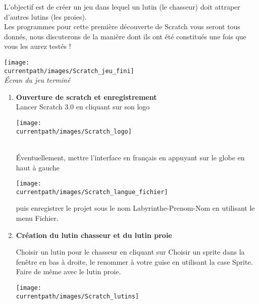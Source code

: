 \begin{changemargin}{-15mm}{-15mm}
\begin{enigme}
    L'objectif est de créer un jeu dans lequel un lutin (le chasseur) doit attraper d'autres lutins (les proies). \\
    Les programmes pour cette première découverte de Scratch vous seront tous donnés, nous discuterons de la manière dont ils ont été constitués une fois que vous les aurez testés !
    \begin{center}
       \texttt{[image: \\currentpath/images/Scratch\_jeu\_fini]} \\
       {\it Écran du jeu terminé}
    \end{center}

    \begin{enumerate}
       \item {\bf Ouverture de scratch et enregistrement} \dotfill \\ [1mm]
          Lancer \textcolor{B1}{Scratch 3.0} en cliquant sur son logo \parbox{1cm}{\texttt{[image: \\currentpath/images/Scratch\_logo]}} \\
          Éventuellement, mettre l'interface en français en appuyant sur le \textcolor{B1}{globe} en haut à gauche \parbox{2.5cm}{\texttt{[image: \\currentpath/images/Scratch\_langue\_fichier]}} puis enregistrer le projet sous le nom \og Labyrinthe-Prenom-Nom \fg{} en utilisant le menu \textcolor{B1}{Fichier}. \\
 
       \item {\bf Création du lutin chasseur et du lutin proie} \dotfill \\ 
          \begin{minipage}{8cm}
             Choisir un lutin pour le chasseur en cliquant sur \textcolor{B1}{Choisir un sprite} dans la fenêtre en bas à droite, le renommer à votre guise en utilisant la case \textcolor{B1}{Sprite}. \\
             Faire de même avec le lutin proie.
          \end{minipage}
          \qquad
          \begin{minipage}{7cm}
             \texttt{[image: \\currentpath/images/Scratch\_lutins]}
          \end{minipage}
 

\end{enumerate}
\end{enigme}
\end{changemargin}
